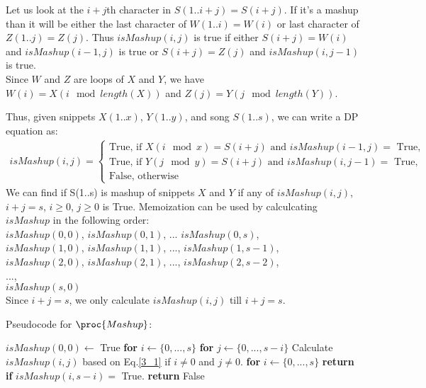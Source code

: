 \documentclass[11pt]{article}
\begin{document}
Let us look at the $i+j$th character in $S(1..i+j) = S(i+j)$. If it's a mashup than it will be either the last character of $W(1..i) = W(i)$ or last character of $Z(1..j) = Z(j)$. Thus $isMashup(i,j)$ is true if either $S(i+j) = W(i)$ and $isMashup(i-1,j)$ is true or $S(i+j) = Z(j)$ and $isMashup(i,j-1)$ is true.\\

Since $W$ and $Z$ are loops of $X$ and $Y$, we have $W(i) = X(i\mod{length(X)})$ and $Z(j) = Y(j \mod{length(Y)})$.

Thus, given snippets $X(1..x)$, $Y(1..y)$, and song $S(1..s)$, we can write a DP equation as:
\begin{equation}\label{3_1}
    \begin{split}
       isMashup(i,j) = 
       \begin{cases}
            \text{True, if } X(i\mod x) = S(i+j) \text{ and } isMashup(i-1,j) =\text{ True},\\
            \text{True, if } Y(j\mod y) = S(i+j) \text{ and } isMashup(i,j-1) =\text{ True},\\
            \text{False, otherwise}
        \end{cases}
    \end{split}
\end{equation}
We can find if S(1..s) is mashup of snippets $X$ and $Y$ if any of $isMashup(i,j)$, $i+j=s$, $i\geq0$, $j\geq0$ is True. Memoization can be used by calculcating $isMashup$ in the following order:\\
$isMashup(0,0)$, $isMashup(0,1)$, ... $isMashup(0,s)$,\\
$isMashup(1,0)$, $isMashup(1,1)$, ..., $isMashup(1,s-1)$,\\
$isMashup(2,0)$, $isMashup(2,1)$, ..., $isMashup(2,s-2)$,\\
...,\\
$isMashup(s,0)$\\
Since $i+j = s$, we only calculate $isMashup(i,j)$ till $i+j = s$.

Pseudocode for $\proc{Mashup}$:
 \begin{codebox}
\li $isMashup(0,0) \leftarrow$ True
\li \textbf{for} $i \leftarrow \{0, ..., s\}$
\li \quad \textbf{for} $j \leftarrow \{0, ..., s-i\}$
\li \quad \quad Calculate $isMashup(i,j)$ based on Eq.\eqref{3_1} if $i\neq 0$ and $j \neq 0$.
\li \textbf{for} $i \leftarrow \{0, ..., s\}$
\li \quad \textbf{return}  \textbf{if} $isMashup(i,s-i) =$ True.
\li \textbf{return} False
\end{codebox}
\end{document}
